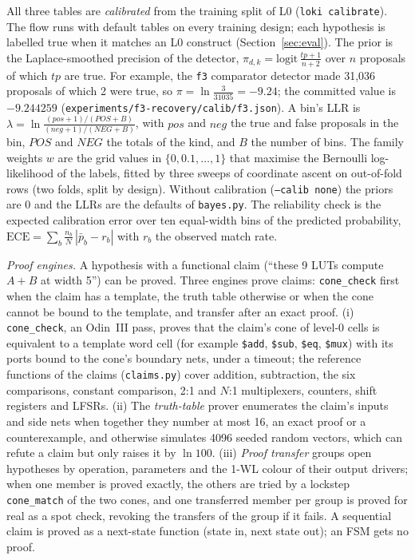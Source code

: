 \documentclass[conference]{IEEEtran}
\newcommand{\code}[1]{\texttt{#1}}
\begin{document}
All three tables are \emph{calibrated} from the training split of L0 (\code{loki calibrate}).
The flow runs with default tables on every training design; each hypothesis is labelled true
when it matches an L0 construct (Section~\ref{sec:eval}). The prior is the Laplace-smoothed
precision of the detector, $\pi_{d,k}=\mathrm{logit}\,\frac{tp+1}{n+2}$ over $n$ proposals of
which $tp$ are true. For example, the \code{f3} comparator detector made 31,036 proposals of
which 2 were true, so $\pi=\ln\frac{3}{31035}=-9.24$; the committed value is $-9.244259$
(\code{experiments/f3-recovery/calib/f3.json}). A bin's LLR is $\lambda=\ln\frac{(pos+1)/(POS+B)}{(neg+1)/(NEG+B)}$,
with $pos$ and $neg$ the true and false proposals in the bin, $POS$ and $NEG$ the totals of
the kind, and $B$ the number of bins. The family weights $w$ are the grid values in $\{0,0.1,\dots,1\}$
that maximise the Bernoulli log-likelihood of the labels, fitted by three sweeps of
coordinate ascent on out-of-fold rows (two folds, split by design). Without calibration
(\code{--calib none}) the priors are 0 and the LLRs are the defaults of \code{bayes.py}. The
reliability check is the expected calibration error over ten equal-width bins of the
predicted probability, $\mathrm{ECE}=\sum_b\frac{n_b}{N}\,|\bar p_b-r_b|$ with $r_b$ the
observed match rate.

\emph{Proof engines.} A hypothesis with a functional claim (``these 9 LUTs compute $A+B$ at
width 5'') can be proved. Three engines prove claims: \code{cone\_check} first when the claim has a template, the
truth table otherwise or when the cone cannot be bound to the template, and transfer after an
exact proof.
(i) \code{cone\_check}, an Odin~III pass, proves that the claim's cone of level-0 cells is
equivalent to a template word cell (for example \code{\$add}, \code{\$sub}, \code{\$eq},
\code{\$mux}) with its ports bound to the cone's boundary nets, under a timeout; the
reference functions of the claims (\code{claims.py}) cover addition, subtraction, the six
comparisons, constant comparison, 2:1 and $N$:1 multiplexers, counters, shift registers
and LFSRs. (ii) The \emph{truth-table} prover enumerates the claim's inputs and side nets when together they number
at most 16, an exact proof or a counterexample, and otherwise simulates 4096 seeded random
vectors, which can refute a claim but only raises it by $\ln 100$. (iii) \emph{Proof transfer}
groups open hypotheses by operation, parameters and the 1-WL colour of their output
drivers; when one member is proved exactly, the others are tried by a lockstep
\code{cone\_match} of the two cones, and one transferred member per group is proved for real
as a spot check, revoking the transfers of the group if it fails. A sequential claim is proved
as a next-state function (state in, next state out); an FSM gets no proof.
\end{document}
